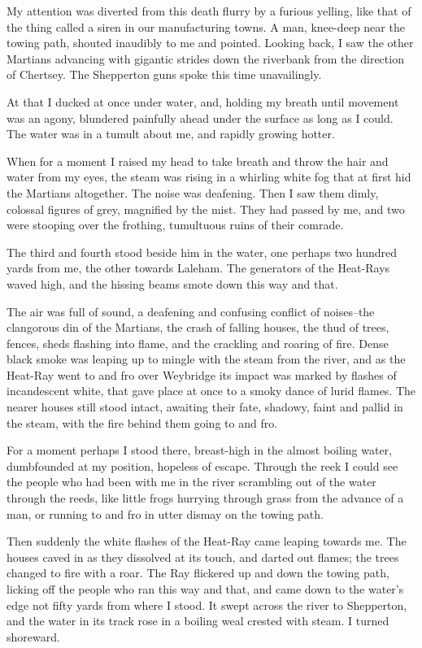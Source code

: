 My attention was diverted from this death flurry by a furious
yelling, like that of the thing called a siren in our manufacturing
towns. A man, knee-deep near the towing path, shouted inaudibly to
me and pointed. Looking back, I saw the other Martians advancing
with gigantic strides down the riverbank from the direction of
Chertsey. The Shepperton guns spoke this time unavailingly.

At that I ducked at once under water, and, holding my breath until
movement was an agony, blundered painfully ahead under the surface
as long as I could. The water was in a tumult about me, and rapidly
growing hotter.

When for a moment I raised my head to take breath and throw the
hair and water from my eyes, the steam was rising in a whirling
white fog that at first hid the Martians altogether. The noise was
deafening. Then I saw them dimly, colossal figures of grey,
magnified by the mist. They had passed by me, and two were stooping
over the frothing, tumultuous ruins of their comrade.

The third and fourth stood beside him in the water, one perhaps two
hundred yards from me, the other towards Laleham. The generators of
the Heat-Rays waved high, and the hissing beams smote down this way
and that.

The air was full of sound, a deafening and confusing conflict of
noises--the clangorous din of the Martians, the crash of falling
houses, the thud of trees, fences, sheds flashing into flame, and
the crackling and roaring of fire. Dense black smoke was leaping up
to mingle with the steam from the river, and as the Heat-Ray went
to and fro over Weybridge its impact was marked by flashes of
incandescent white, that gave place at once to a smoky dance of
lurid flames. The nearer houses still stood intact, awaiting their
fate, shadowy, faint and pallid in the steam, with the fire behind
them going to and fro.

For a moment perhaps I stood there, breast-high in the almost
boiling water, dumbfounded at my position, hopeless of escape.
Through the reek I could see the people who had been with me in the
river scrambling out of the water through the reeds, like little
frogs hurrying through grass from the advance of a man, or running
to and fro in utter dismay on the towing path.

Then suddenly the white flashes of the Heat-Ray came leaping
towards me. The houses caved in as they dissolved at its touch, and
darted out flames; the trees changed to fire with a roar. The Ray
flickered up and down the towing path, licking off the people who
ran this way and that, and came down to the water's edge not fifty
yards from where I stood. It swept across the river to Shepperton,
and the water in its track rose in a boiling weal crested with
steam. I turned shoreward.

